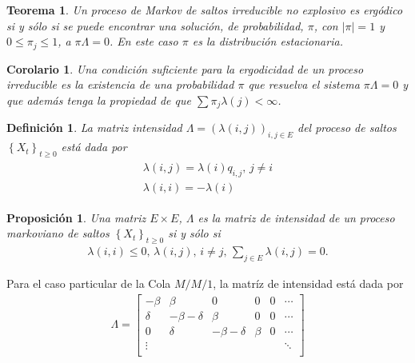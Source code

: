 \documentclass{article}
\newtheorem{Def}{Definición}[section]
\newtheorem{Teo}{Teorema}[section]
\newtheorem{Prop}{Proposición}[section]
\newtheorem{Cor}{Corolario}[section]
\numberwithin{equation}{section}
\begin{document}
\begin{Teo}\label{Teo.4.3}
Un proceso de Markov de saltos irreducible no explosivo es erg\'odico si y s\'olo si se puede encontrar una soluci\'on, de probabilidad, $\pi$, con $|\pi|=1$ y $0\leq\pi_{j}\leq1$, a $\pi\Lambda=0$. En este caso $\pi$ es la distribuci\'on estacionaria.
\end{Teo}

\begin{Cor}\label{Cor.4.4}
Una condici\'on suficiente para la ergodicidad de un proceso irreducible es la existencia de una probabilidad $\pi$ que resuelva el sistema $\pi\Lambda=0$ y que adem\'as tenga la propiedad de que $\sum\pi_{j}\lambda\left(j\right)<\infty$.
\end{Cor}

\begin{Def}
La matriz intensidad $\Lambda=\left(\lambda\left(i,j\right)\right)_{i,j\in E}$ del proceso de saltos $\left\{X_{t}\right\}_{t\geq0}$ est\'a dada por
\begin{eqnarray}
\begin{array}{l}
\lambda\left(i,j\right)=\lambda\left(i\right)q_{i,j}\textrm{,    }j\neq i\\
\lambda\left(i,i\right)=-\lambda\left(i\right)
\end{array}
\end{eqnarray}
\end{Def}


\begin{Prop}\label{Prop.3.1}
Una matriz $E\times E$, $\Lambda$ es la matriz de intensidad de un proceso markoviano de saltos $\left\{X_{t}\right\}_{t\geq0}$ si y s\'olo si
\begin{eqnarray}
\lambda\left(i,i\right)\leq0\textrm{, }\lambda\left(i,j\right)\textrm{,   }i\neq j\textrm{,  }\sum_{j\in E}\lambda\left(i,j\right)=0.
\end{eqnarray}
\end{Prop}

Para el caso particular de la Cola $M/M/1$, la matr\'iz de intensidad est\'a dada por
\begin{eqnarray*}
\Lambda=\left[\begin{array}{cccccc}
-\beta & \beta & 0 &0 &0& \cdots\\
\delta & -\beta-\delta & \beta & 0 & 0 &\cdots\\
0 & \delta & -\beta-\delta & \beta & 0 &\cdots\\
\vdots & & & & & \ddots\\
\end{array}\right]
\end{eqnarray*}
\end{document}
